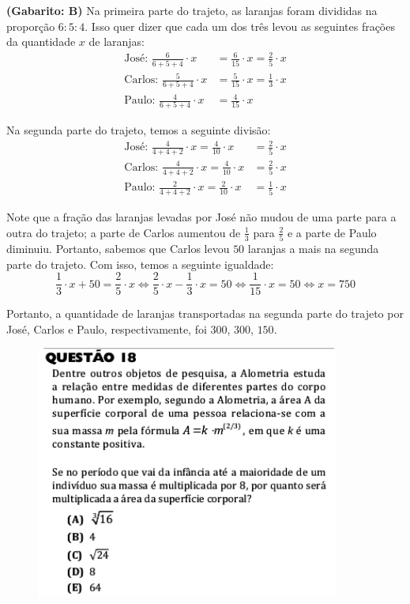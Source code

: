 \documentclass[a4paper]{article}
\begin{document}
\par\textbf{(Gabarito: B)} Na primeira parte do trajeto, as laranjas foram divididas na proporção $6:5:4$. Isso quer dizer que cada um dos três levou as seguintes frações da quantidade $x$ de laranjas:
\begin{align*}
\text{José: }\frac{6}{6+5+4}\cdot x &= \frac{6}{15}\cdot x = \frac{2}{5}\cdot x \\
\text{Carlos: }\frac{5}{6+5+4}\cdot x &= \frac{5}{15}\cdot x = \frac{1}{3}\cdot x \\
\text{Paulo: }\frac{4}{6+5+4}\cdot x &= \frac{4}{15}\cdot x  
\end{align*}
\par\vspace{0.3cm} Na segunda parte do trajeto, temos a seguinte divisão:
\begin{align*}
\text{José: }\frac{4}{4+4+2}\cdot x = \frac{4}{10}\cdot x &= \frac{2}{5}\cdot x \\
\text{Carlos: }\frac{4}{4+4+2}\cdot x = \frac{4}{10}\cdot x &= \frac{2}{5}\cdot x \\
\text{Paulo: }\frac{2}{4+4+2}\cdot x = \frac{2}{10}\cdot x &= \frac{1}{5}\cdot x
\end{align*}
\par\vspace{0.3cm} Note que a fração das laranjas levadas por José não mudou de uma parte para a outra do trajeto; a parte de Carlos aumentou de $\displaystyle{ \frac{1}{3} }$ para $\displaystyle{ \frac{2}{5} }$ e a parte de Paulo diminuiu. Portanto, sabemos que Carlos levou $50$ laranjas a mais na segunda parte do trajeto. Com isso, temos a seguinte igualdade:
\begin{equation*}
\frac{1}{3}\cdot x + 50 = \frac{2}{5}\cdot x \iff \frac{2}{5}\cdot x - \frac{1}{3}\cdot x = 50 \iff \frac{1}{15}\cdot x = 50 \iff x = 750
\end{equation*}
\par\vspace{0.3cm} Portanto, a quantidade de laranjas transportadas na segunda parte do trajeto por José, Carlos e Paulo, respectivamente, foi $300$, $300$, $150$.
\begin{figure}[H]
	\begin{center}
		\includegraphics[width=10cm]{L2Q18.png}
	\end{center}
\end{figure}
\end{document}
